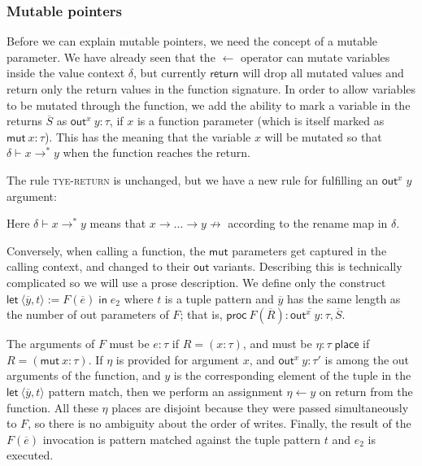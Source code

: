 \documentclass[acmsmall,nonacm]{acmart}
\newcommand{\proves}{\vdash}
\newcommand{\makes}{\dashv}
\begin{document}
\subsubsection{Mutable pointers}
Before we can explain mutable pointers, we need the concept of a mutable parameter. We have already seen that the $\gets$ operator can mutate variables inside the value context $\delta$, but currently $\mathsf{return}$ will drop all mutated values and return only the return values in the function signature. In order to allow variables to be mutated through the function, we add the ability to mark a variable in the returns $\overline{S}$ as $\mathsf{out}^x\ y:\tau$, if $x$ is a function parameter (which is itself marked as $\mathsf{mut}\ x:\tau$). This has the meaning that the variable $x$ will be mutated so that $\delta\proves x\to^* y$ when the function reaches the return.

The rule \textsc{tye-return} is unchanged, but we have a new rule for fulfilling an $\mathsf{out}^x\;y$ argument:
Here $\delta\proves x\to^*y$ means that $x\to\dots\to y\not\to$ according to the rename map in $\delta$.

Conversely, when calling a function, the $\mathsf{mut}$ parameters get captured in the calling context, and changed to their $\mathsf{out}$ variants. Describing this is technically complicated so we will use a prose description. We define only the construct $\mathsf{let}\ \langle \overline{y},t\rangle:=F(\overline{e})\;\mathsf{in}\; e_2$ where $t$ is a tuple pattern and $\overline{y}$ has the same length as the number of out parameters of $F$; that is, $\mathsf{proc}\ F(\overline{R}):\overline{\mathsf{out}^x\;y:\tau},\overline{S}$.

The arguments of $F$ must be $e:\tau$ if $R=(x:\tau)$, and must be $\eta:\tau\;\mathsf{place}$ if $R=(\mathsf{mut}\ x:\tau)$. If $\eta$ is provided for argument $x$, and $\mathsf{out}^x\ y:\tau'$ is among the out arguments of the function, and $y$ is the corresponding element of the tuple in the $\mathsf{let}\ \langle \overline{y},t\rangle$ pattern match, then we perform an assignment $\eta \gets y$ on return from the function. All these $\eta$ places are disjoint because they were passed simultaneously to $F$, so there is no ambiguity about the order of writes. Finally, the result of the $F(\overline{e})$ invocation is pattern matched against the tuple pattern $t$ and $e_2$ is executed.
\end{document}

